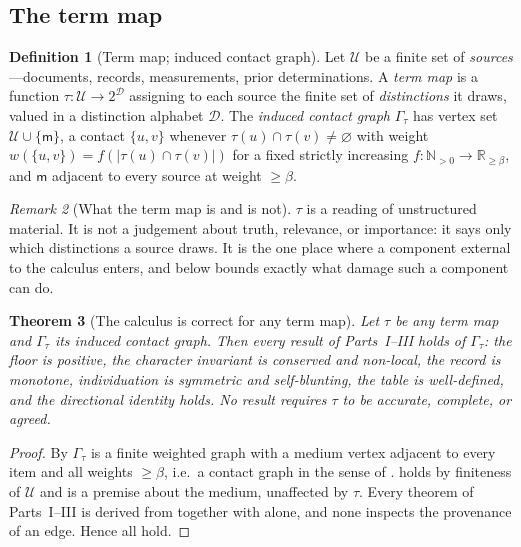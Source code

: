 \documentclass[11pt,twocolumn,a4paper]{article}
\theoremstyle{dirthm}
\newtheorem{theorem}{Theorem}[section]
\theoremstyle{definition}
\newtheorem{definition}[theorem]{Definition}
\theoremstyle{remark}
\newtheorem{remark}[theorem]{Remark}
\newcommand{\R}{\mathbb{R}}
\newcommand{\N}{\mathbb{N}}
\newcommand{\Gph}{\Gamma}
\newcommand{\wt}{w}
\newcommand{\med}{\mathsf{m}}
\newcommand{\flo}{\beta}
\newcommand{\terms}{\tau}
\newcommand{\abs}[1]{\lvert#1\rvert}
\newcommand{\set}[1]{\{#1\}}
\begin{document}
\subsection{The term map}

\begin{definition}[Term map; induced contact graph]
\label{def:term-map}
Let $\mathcal{U}$ be a finite set of \emph{sources}---documents, records,
measurements, prior determinations. A \emph{term map} is a function
$\terms\colon\mathcal{U}\to 2^{\mathcal{D}}$ assigning to each source the
finite set of \emph{distinctions} it draws, valued in a distinction alphabet
$\mathcal{D}$. The \emph{induced contact graph} $\Gph_\terms$ has vertex set
$\mathcal{U}\cup\set{\med}$, a contact $\set{u,v}$ whenever
$\terms(u)\cap\terms(v)\neq\varnothing$ with weight
$\wt(\set{u,v})=f(\abs{\terms(u)\cap\terms(v)})$ for a fixed strictly
increasing $f\colon\N_{>0}\to\R_{\ge\flo}$, and $\med$ adjacent to every
source at weight $\ge\flo$.
\end{definition}

\begin{remark}[What the term map is and is not]
\label{rem:term-map-is}
$\terms$ is a reading of unstructured material. It is not a judgement about
truth, relevance, or importance: it says only which distinctions a source
draws. It is the one place where a component external to the calculus
enters, and  below bounds exactly what damage such a
component can do.
\end{remark}

\begin{theorem}[The calculus is correct for any term map]
\label{thm:tau-agnostic}
Let $\terms$ be any term map and $\Gph_\terms$ its induced contact graph.
Then every result of Parts~I--III holds of $\Gph_\terms$: the floor is
positive, the character invariant is conserved and non-local, the record is
monotone, individuation is symmetric and self-blunting, the table is
well-defined, and the directional identity holds. No result requires
$\terms$ to be accurate, complete, or agreed.
\end{theorem}

\begin{proof}
By  $\Gph_\terms$ is a finite weighted graph with a
medium vertex adjacent to every item and all weights $\ge\flo$, i.e.\ a
contact graph in the sense of .  holds by
finiteness of $\mathcal{U}$ and  is a premise about
the medium, unaffected by $\terms$. Every theorem of Parts~I--III is derived
from  together with 
alone, and none inspects the provenance of an edge. Hence all hold.
\end{proof}
\end{document}
